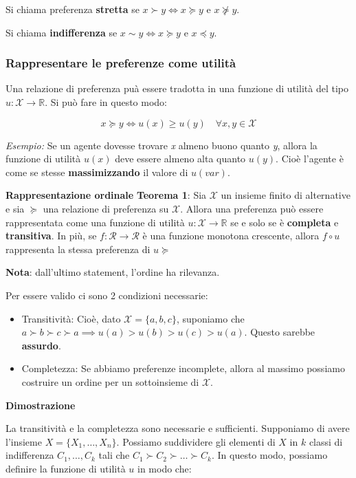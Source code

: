 Si chiama preferenza \textbf{stretta} se $x \succ y \iff x \succcurlyeq y$ e $x
    \nsucceq y$.

Si chiama \textbf{indifferenza} se $x \sim y \iff x \succcurlyeq y$ e $x
    \preccurlyeq y$.

\subsubsection{Rappresentare le preferenze come \textbf{utilità}}

Una relazione di preferenza puà essere tradotta in una funzione di utilità del
tipo $u: \mathcal{X} \rightarrow \mathbb{R}$. Si può fare in questo modo:

\begin{equation}
    x \succcurlyeq y \iff u(x) \geq u(y) \quad \forall x,y \in \mathcal{X}
\end{equation}

\textit{Esempio:} Se un agente dovesse trovare \textit{x} almeno buono quanto \textit{y}, allora la funzione di utilità $u(x)$ deve essere almeno
alta quanto $u(y)$. Cioè l'agente è come se stesse \textbf{massimizzando} il valore di $u(var)$.

\textbf{Rappresentazione ordinale}
\textbf{Teorema 1}: Sia $\mathcal{X}$ un insieme finito di alternative e sia $\succcurlyeq$ una relazione di preferenza su $\mathcal{X}$.
Allora una preferenza può essere rappresentata come una funzione di utilità $u: \mathcal{X} \rightarrow \mathbb{R}$ se e solo se è \textbf{completa} e \textbf{transitiva}.
In più, se $f:\mathcal{R} \rightarrow \mathcal{R}$ è una funzione monotona crescente, allora $f \circ u$ rappresenta la stessa preferenza di $u \succcurlyeq$

\textbf{Nota}: dall'ultimo statement, l'ordine ha rilevanza.

Per essere valido ci sono 2 condizioni necessarie:
\begin{itemize}
    \item Transitività: Cioè, dato $\mathcal{X} = \{a,b,c\}$, suponiamo che $a \succ b
              \succ c \succ a \implies u(a) > u(b) > u(c) > u(a)$. Questo sarebbe
          \textbf{assurdo}.
    \item Completezza: Se abbiamo preferenze incomplete, allora al massimo possiamo
          costruire un ordine per un sottoinsieme di $\mathcal{X}$.
\end{itemize}

\textbf{Dimostrazione}

La transitività e la completezza sono necessarie e sufficienti. Supponiamo di
avere l'insieme $X = \{X_1, \ldots, X_n\}$. Possiamo suddividere gli elementi
di $X$ in $k$ classi di indifferenza $C_1, \ldots, C_k$ tali che $C_1 \succ C_2
    \succ \ldots \succ C_k$. In questo modo, possiamo definire la funzione di
utilità $u$ in modo che:

